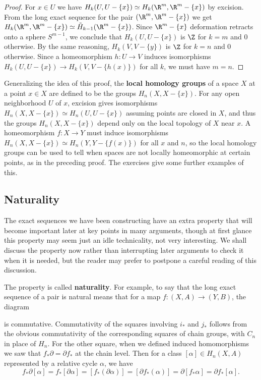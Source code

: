 \begin{proof}
For $x \in U$ we have $H_k(U, U - \{x\}) \simeq H_k(\R^m, \R^m - \{x\})$ by excision. From the long exact sequence for the pair $(\R^m, \R^m - \{x\})$ we get $H_k(\R^m, \R^m - \{x\}) \simeq \tilde{H}_{k-1}(\R^m - \{x\})$. Since $\R^m - \{x\}$ deformation retracts onto a sphere $S^{m-1}$, we conclude that $H_k(U, U - \{x\})$ is $\Z$ for $k = m$ and 0 otherwise. By the same reasoning, $H_k(V, V - \{y\})$ is $\Z$ for $k = n$ and 0 otherwise. Since a homeomorphism $h:U\to V$ induces isomorphisms $H_k(U, U - \{x\})\to H_k(V, V - \{h(x)\})$ for all $k$, we must have $m = n$.
\end{proof}
Generalizing the idea of this proof, the \textbf{local homology groups} of a space $X$ at a point $x \in X$ are defined to be the groups $H_n(X, X - \{x\})$. For any open neighborhood $U$ of $x$, excision gives isomorphisms $H_n(X, X - \{x\}) \simeq H_n(U, U - \{x\})$ assuming points are closed in $X$, and thus the groups $H_n(X, X - \{x\})$ depend only on the local topology of $X$ near $x$. A homeomorphism $f:X\to Y$ must induce isomorphisms $H_n(X, X - \{x\}) \simeq H_n(Y, Y - \{f(x)\})$ for all $x$ and $n$, so the local homology groups can be used to tell when spaces are not locally homeomorphic at certain points, as in the preceding proof. The exercises give some further examples of this.

\subsection*{Naturality}

The exact sequences we have been constructing have an extra property that will become important later at key points in many arguments, though at first glance this property may seem just an idle technicality, not very interesting. We shall discuss the property now rather than interrupting later arguments to check it when it is needed, but the reader may prefer to postpone a careful reading of this discussion.

The property is called \textbf{naturality}. For example, to say that the long exact sequence of a pair is natural means that for a map $f:(X,A)\to(Y,B)$, the diagram

is commutative. Commutativity of the squares involving $i_*$ and $j_*$ follows from the obvious commutativity of the corresponding squares of chain groups, with $C_n$ in place of $H_n$. For the other square, when we defined induced homomorphisms we saw that $f_*\partial = \partial f_*$ at the chain level. Then for a class $[\alpha] \in H_n(X,A)$ represented by a relative cycle $\alpha$, we have
\[f_*\partial[\alpha] = f_*[\partial\alpha] = [f_*(\partial\alpha)] = [\partial f_*(\alpha)] = \partial[f_*\alpha] = \partial f_*[\alpha].\]

